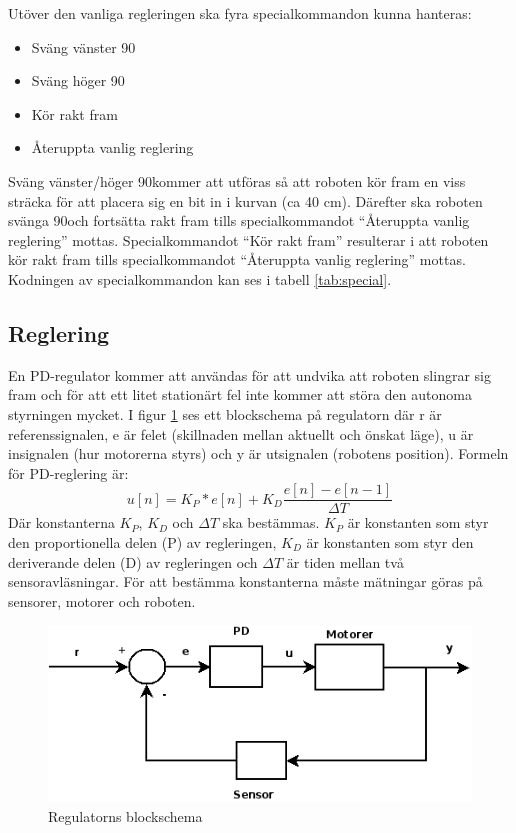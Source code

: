 Utöver den vanliga regleringen ska fyra specialkommandon kunna hanteras:
\begin{itemize}
  \item{Sväng vänster 90\degree}
  \item{Sväng höger 90\degree}
  \item{Kör rakt fram}
  \item{Återuppta vanlig reglering}
\end{itemize}

Sväng vänster/höger 90\degree  kommer att utföras så att roboten kör fram en viss sträcka för att placera sig en bit in i kurvan (ca 40 cm). Därefter ska roboten svänga 90\degree  och fortsätta rakt fram tills specialkommandot ``Återuppta vanlig reglering'' mottas.
Specialkommandot ``Kör rakt fram'' resulterar i att roboten kör rakt fram tills specialkommandot ``Återuppta vanlig reglering'' mottas.
Kodningen av specialkommandon kan ses i tabell \ref{tab:special}.

\subsection{Reglering}
\label{reglering}
En PD-regulator kommer att användas för att undvika att roboten slingrar sig fram och för att ett litet stationärt fel inte kommer att störa
den autonoma styrningen mycket. I figur \ref{fig:regulator} ses ett blockschema på regulatorn där r är referenssignalen,
e är felet (skillnaden mellan aktuellt och önskat läge), u är insignalen (hur motorerna styrs) och y är utsignalen (robotens position).
Formeln för PD-reglering är: $$ u[n] = K_P*e[n] + K_D\frac{e[n]-e[n-1]}{\Delta T}$$
Där konstanterna $K_P$, $K_D$ och $\Delta T$ ska bestämmas. $K_P$ är konstanten som styr den proportionella delen (P) av regleringen, 
$K_D$ är konstanten som styr den deriverande delen (D) av regleringen och $\Delta T$ är tiden mellan två sensoravläsningar. 
För att bestämma konstanterna måste mätningar göras på sensorer, motorer och roboten.

\begin{figure}[H]
  \centering
  \includegraphics[scale=0.7]{bilder/regulator.png}
  \caption{Regulatorns blockschema}
  \label{fig:regulator}
\end{figure}


